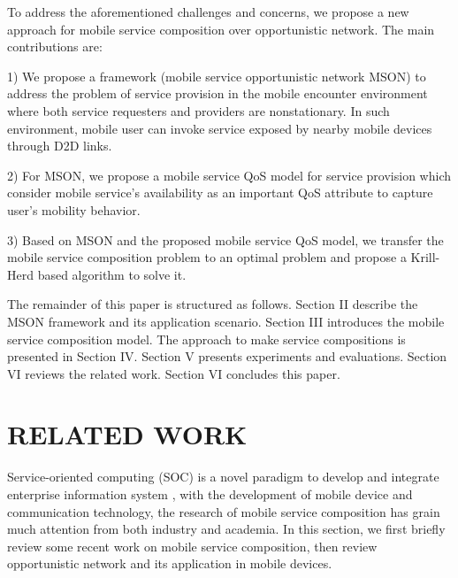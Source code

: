 \documentclass[10pt,journal,compsoc]{IEEEtran}
\begin{document}
To address the aforementioned challenges and concerns, we propose a new approach for mobile service composition over opportunistic network. The main contributions are:

1) We propose a framework (mobile service opportunistic network MSON) to address the problem of service provision in the mobile encounter environment where both service requesters and providers are nonstationary. In such environment, mobile user can invoke service exposed by nearby mobile devices through D2D links.

2) For MSON, we propose a mobile service QoS model for service provision which consider mobile service's availability as an important QoS attribute to capture user's mobility behavior.

3) Based on MSON and the proposed mobile service QoS model, we transfer the mobile service composition problem to an optimal problem and propose a Krill-Herd based algorithm to solve it. 

The remainder of this paper is structured as follows. Section II describe the MSON framework and its application scenario. Section III introduces the mobile service composition model. The approach to make service compositions is presented in Section IV. Section V presents experiments and evaluations. Section VI reviews the related work. Section VI concludes this paper.

\section{RELATED WORK}
Service-oriented computing (SOC) is a novel paradigm to develop and integrate enterprise information system \cite{papazoglou2003service}, with the development of mobile device and communication technology, the research of mobile service composition has grain much attention from both industry and academia. In this section, we first briefly review some recent work on mobile service composition, then review opportunistic network and its application in mobile devices.
\end{document}
